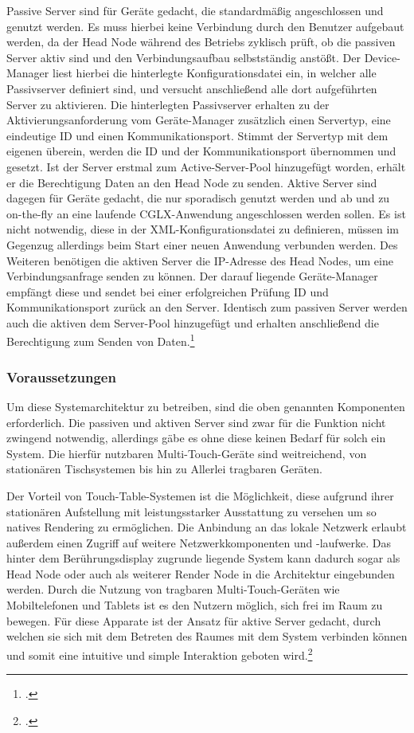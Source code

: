 Passive Server sind für Geräte gedacht, die standardmäßig angeschlossen und genutzt werden. Es muss hierbei keine Verbindung durch den Benutzer aufgebaut werden, da der Head Node während des Betriebs zyklisch prüft, ob die passiven Server aktiv sind und den Verbindungsaufbau selbstständig anstößt. Der Device-Manager liest hierbei die hinterlegte Konfigurationsdatei ein, in welcher alle Passivserver definiert sind, und versucht anschließend alle dort aufgeführten Server zu aktivieren. Die hinterlegten Passivserver erhalten zu der Aktivierungsanforderung vom Geräte-Manager zusätzlich einen Servertyp, eine eindeutige ID und einen Kommunikationsport. Stimmt der Servertyp mit dem eigenen überein, werden die ID und der Kommunikationsport übernommen und gesetzt. Ist der Server erstmal zum Active-Server-Pool hinzugefügt worden, erhält er die Berechtigung Daten an den Head Node zu senden.
Aktive Server sind dagegen für Geräte gedacht, die nur sporadisch genutzt werden und ab und zu on-the-fly an eine laufende CGLX-Anwendung angeschlossen werden sollen. Es ist nicht notwendig, diese in der XML-Konfigurationsdatei zu definieren, müssen im Gegenzug allerdings beim Start einer neuen Anwendung verbunden werden. Des Weiteren benötigen die aktiven Server die IP-Adresse des Head Nodes, um eine Verbindungsanfrage senden zu können. Der darauf liegende Geräte-Manager empfängt diese und sendet bei einer erfolgreichen Prüfung ID und Kommunikationsport zurück an den Server. Identisch zum passiven Server werden auch die aktiven dem Server-Pool hinzugefügt und erhalten anschließend die Berechtigung zum Senden von Daten.\footcite[Vgl.][Seite 651 f.]{Table}

\subsubsection{Voraussetzungen}
Um diese Systemarchitektur zu betreiben, sind die oben genannten Komponenten erforderlich. Die passiven und aktiven Server sind zwar für die Funktion nicht zwingend notwendig, allerdings gäbe es ohne diese keinen Bedarf für solch ein System. Die hierfür nutzbaren Multi-Touch-Geräte sind weitreichend, von stationären Tischsystemen bis hin zu Allerlei tragbaren Geräten.

Der Vorteil von Touch-Table-Systemen ist die Möglichkeit, diese aufgrund ihrer stationären Aufstellung mit leistungsstarker Ausstattung zu versehen um so natives Rendering zu ermöglichen. Die Anbindung an das lokale Netzwerk erlaubt außerdem einen Zugriff auf weitere Netzwerkkomponenten und -laufwerke. Das hinter dem Berührungsdisplay zugrunde liegende System kann dadurch sogar als Head Node oder auch als weiterer Render Node in die Architektur eingebunden werden. 
Durch die Nutzung von tragbaren Multi-Touch-Geräten wie Mobiltelefonen und Tablets ist es den Nutzern möglich, sich frei im Raum zu bewegen. Für diese Apparate ist der Ansatz für aktive Server gedacht, durch welchen sie sich mit dem Betreten des Raumes mit dem System verbinden können und somit eine intuitive und simple Interaktion geboten wird.\footcite[Vgl.][Seite 652]{Table}

